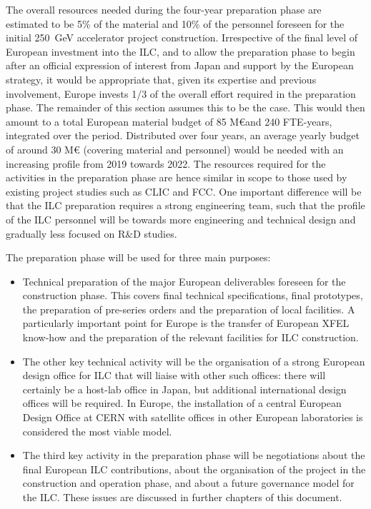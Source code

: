 \documentclass[%
 reprint,
 amsmath,amssymb,
 aps,
]{revtex4-1}
\begin{document}
The overall resources needed during the four-year preparation phase are estimated to be 5\% of the material and 10\% of the personnel foreseen for the initial 250~GeV accelerator project construction. Irrespective of the final level of European investment into the ILC, and to allow the preparation phase to begin after an official expression of interest from Japan and support by the European strategy, it would be appropriate that, given its expertise and previous involvement, Europe invests 1/3 of the overall effort required in the preparation phase. The remainder of this section assumes this to be the case. This would then amount to a total European material budget of 85 M\euro and 240 FTE-years, integrated over the period.
Distributed over four years, an average yearly budget of around 30 M\euro{} (covering material and personnel) would be needed with an increasing profile from 2019 towards 2022. The resources required for the activities in the preparation phase are hence similar in scope to those used by existing project studies such as CLIC and FCC. One important difference will be that the ILC preparation requires a strong engineering team, such that the profile of the ILC personnel will be towards more engineering and technical design and gradually less focused on R\&D studies.

The preparation phase will be used for three main purposes:

\begin{itemize}
\item 
Technical preparation of the major European deliverables foreseen for the construction phase. This covers final technical specifications, final prototypes, the preparation of pre-series orders and the preparation of local facilities. A particularly important point for Europe is the transfer of European XFEL know-how and the preparation of the relevant facilities for ILC construction.
\item
The other key technical activity will be the organisation of a strong European design office for ILC that will liaise with other such offices: there will certainly be a host-lab office in Japan, but additional international design offices will be required. In Europe, the installation of a central European Design Office at CERN with satellite offices in other European laboratories is considered the most viable model.
\item 
The third key activity in the preparation phase will be negotiations about the final European ILC contributions, about the organisation of the project in the construction and operation phase, and about a future governance model for the ILC. These issues are discussed in further chapters of this document.
\end{itemize}
\end{document}
